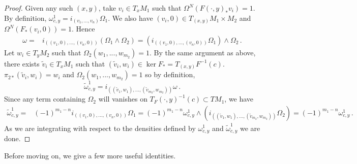 \begin{proof}
Given any such $(x,y)$, take $v_i\in T_xM_1$ such that $\Omega^N(F(\cdot,y)_*v_i)=1$. By definition, $\omega_{c,y}^1=i_{(v_1,...,v_n)}\Omega_1$. We also have $(v_i,0)\in T_{(x,y)}M_1\times M_2$ and $\Omega^N(F_*(v_i,0))=1$. Hence 
\begin{align}
\omega=&i_{((v_1,0),...,(v_n,0))}(\Omega_1\wedge\Omega_2)
=(i_{((v_1,0),...,(v_n,0))}\Omega_1)\wedge\Omega_2\,.
\end{align}
Let $w_i\in T_y M_2$ such that $\Omega_2(w_1,...,w_{m_2})=1$. By the same argument as above, there exists $\tilde{v}_i\in T_xM_1$ such that $(\tilde{v}_i,w_i)\in \ker F_*=T_{(x,y)}F^{-1}(c)$. $\pi_{2*}(\tilde{v}_i,w_i)=w_i$ and $\Omega_2(w_1,...,w_{m_2})=1$ so by definition,
\begin{equation}
\tilde{\omega}_{c,y}^1=i_{((\tilde{v}_1,w_1),...,(\tilde{v}_{m_2},w_{m_2}))}\omega\,.
\end{equation}
Since any term containing $\Omega_2$ will vanishes on $T_F(\cdot,y)^{-1}(c)\subset T M_1$, we have 
\begin{align}
\tilde{\omega}_{c,y}^1=&(-1)^{m_1-n}i_{((v_1,0),...,(v_n,0))}\Omega_1=(-1)^{m_1-n}\omega_{c,y}^1\wedge\left(i_{((\tilde{v}_1,w_1),...,(\tilde{v}_{m_2},w_{m_2}))}\Omega_2\right)=(-1)^{m_1-n}\omega_{c,y}^1\,.
\end{align}
As we are integrating with respect to the densities defined by $\omega_{c,y}^1$ and $\tilde{\omega}_{c,y}^1$ we are done. 
\end{proof}

Before moving on, we give a few more useful identities.

